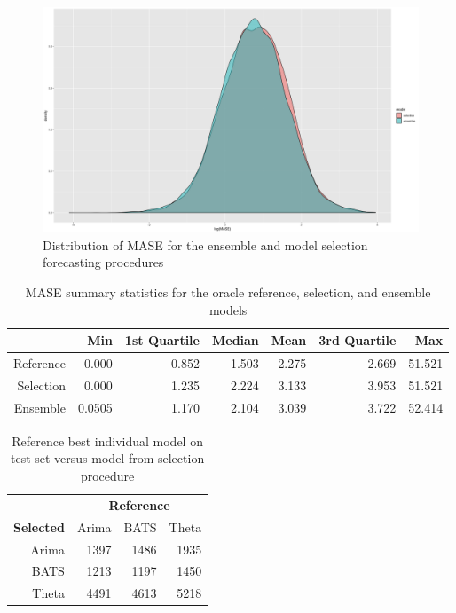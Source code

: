 \documentclass[11pt,3p,review,authoryear]{elsarticle}
\begin{document}
\begin{figure}[h]
\centering
\includegraphics[width=\textwidth]{distribution}
\caption{Distribution of MASE for the ensemble and model selection forecasting procedures}\label{fig:a}
\end{figure}

\begin{table}[ht]
\centering
{}
\begin{tabular}{rrrrrrr}
\hline
& Min & 1st Quartile & Median & Mean & 3rd Quartile & Max\\
\hline
Reference \vline & 0.000 & 0.852 & 1.503 & 2.275 & 2.669 & 51.521\\
Selection \vline & 0.000 & 1.235 & 2.224 & 3.133 & 3.953 & 51.521 \\
Ensemble \vline & 0.0505 & 1.170 & 2.104 & 3.039 & 3.722 & 52.414\\
\hline
\end{tabular}
\caption{MASE summary statistics for the oracle reference, selection, and ensemble models}\label{tab:c}
\end{table}

\begin{table}[ht]
\centering
\begin{tabular}{rrrr}
  \hline
  & \multicolumn{3}{c}{\textbf{Reference}} \\
 \textbf{Selected} & Arima & BATS & Theta  \\
 \hline
 Arima & 1397 & 1486 & 1935 \\ 
   BATS & 1213 & 1197 & 1450 \\ 
  Theta & 4491 & 4613 & 5218 \\ 
   \hline
\end{tabular}
\caption{Reference best individual model on test set versus model from selection procedure}\label{tab:b}
\end{table}
\end{document}
